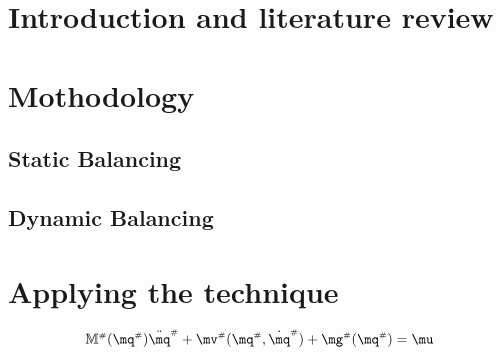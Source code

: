 \documentclass[a4paper,11pt,brazil,fleqn]{article}
\begin{document}




\section{Introduction and literature review}\label{S01}



\section{Mothodology}\label{S02}

\subsection{Static Balancing}\label{S02-1}

\subsection{Dynamic Balancing}\label{S02-2}



\section{Applying the technique}\label{S03}

\begin{equation}
\mM\ssh (\mq\ssh) \ddot{\mq}\ssh + \mv\ssh(\mq\ssh,\dot{\mq}\ssh) + \mg\ssh (\mq\ssh) = \mu
\end{equation}
\end{document}
